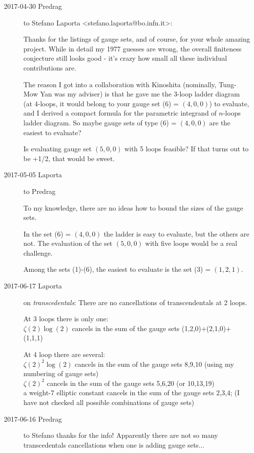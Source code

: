 \begin{description}

\item[2017-04-30 Predrag] to
Stefano Laporta <stefano.laporta@bo.infn.it>:

Thanks for the listings of gauge sets, and of course, for your whole amazing
project. While in detail my 1977 guesses are wrong, the overall finiteness conjecture
still looks good - it's crazy how small all these individual contributions are.

The reason I got into a collaboration with Kinoshita (nominally, Tung-Mow
Yan was my adviser) is that he gave me the 3-loop ladder diagram (at
4-loops, it would belong to your gauge set (6) = $(4,0,0)$) to evaluate,
and I derived a compact formula for the parametric integrand of $n$-loops
ladder diagram. So maybe gauge sets of type (6) = $(4,0,0)$ are the
easiest to evaluate?

Is evaluating gauge set $(5,0,0)$ with 5 loops feasible? If that turns out to be
+1/2, that would be sweet.

\item[2017-05-05 Laporta] to Predrag

To my knowledge, there are no ideas how to bound the sizes of the gauge sets.

In the set (6) = $(4,0,0)$ the ladder is easy to evaluate, but the others are not.
The evaluation of the set $(5,0,0)$ with five loops would be a real challenge.

Among the sets (1)-(6), the easiest to evaluate is the set (3) = $(1,2,1)$.

\item[2017-06-17 Laporta] on \emph{transcedentals}:
There are no cancellations of transcendentals at 2 loops.

At 3 loops there is only one:\\
$\zeta(2)\log(2)$ cancels in the sum of  the gauge sets
(1,2,0)+(2,1,0)+(1,1,1)

At 4 loop there are several:\\
$\zeta(2)^2\log(2)$ cancels in the sum of the gauge sets 8,9,10
(using my numbering of gauge sets) \\
$\zeta(2)^2$        cancels in the sum
of the gauge sets 5,6,20 (or 10,13,19) \\
a weight-7 elliptic constant
cancels in the sum of the gauge sets 2,3,4;
(I have not checked all possible combinations of gauge sets)

\item[2017-06-16 Predrag] to Stefano
thanks for the info!
Apparently there are not so many transcedentals cancellations when one is
adding gauge sets...


\end{description}
